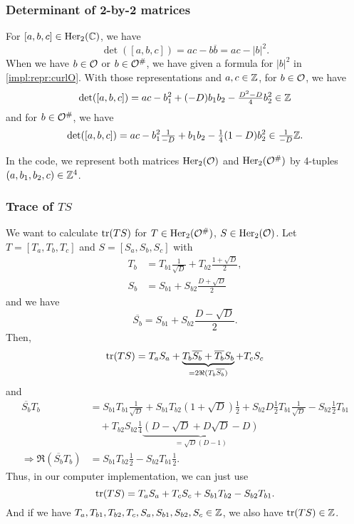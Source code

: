 \subsubsection{Determinant of 2-by-2 matrices}
\label{detCurlO}
For $[a,b,c] \in \operatorname{Her}_2(\mathbb{C})$, we have
\[ \det([a,b,c]) = ac - b \overline{b} = ac - |b|^2 . \]
%
When we have $b \in \mathcal{O}$ or $b \in \mathcal{O}^\#$, we have given a formula for $|b|^2$ in \cref{impl:repr:curlO}. With those representations and $a,c \in \mathbb{Z}$, for $b \in \mathcal{O}$, we have
\[ \det([a,b,c]) = a c -  b_1^2 + (-D) b_1 b_2 - \tfrac{D^2-D}{4} b_2^2 \in \mathbb{Z} \]
and for $b \in \mathcal{O}^\#$, we have
\[ \det([a,b,c]) = a c - b_1^2 \tfrac{1}{-D} + b_1 b_2 - \tfrac{1}{4} (1-D) b_2^2 \in \tfrac{1}{-D} \mathbb{Z} . \]

In the code, we represent both matrices $\operatorname{Her}_2(\mathcal{O})$ and $\operatorname{Her}_2(\mathcal{O}^\#)$ by 4-tuples $(a,b_1,b_2,c) \in \mathbb{Z}^4$.

\subsubsection{Trace of $TS$}
\label{traceST}
We want to calculate $\textup{\textrm{tr}}(TS)$ for $T \in \operatorname{Her}_2(\mathcal{O}^\#)$, $S \in \operatorname{Her}_2(\mathcal{O})$.
Let $T = [T_a, T_b, T_c]$ and $S = [S_a, S_b, S_c]$ with
\begin{align*}
T_b &= T_{b1} \frac{1}{\sqrt{D}} + T_{b2} \frac{1 + \sqrt{D}} {2} , \\
S_b &= S_{b1} + S_{b2} \frac{D + \sqrt{D}} {2}
\end{align*}
and we have
\[ \overline{S_b} = S_{b1} + S_{b2} \frac{D - \sqrt{D}} {2} . \]
Then,
\[
\textup{\textrm{tr}}(T S) = T_a S_a
+ \underbrace{T_b \overline{S_b} + \overline{T_b} S_b}_{= 2 \Re(T_b \overline{S_b})}
+ T_c S_c
\]
and
\begin{align*}
\overline{S_b} T_b &= S_{b1} T_{b1} \tfrac{1}{\sqrt{D}} + S_{b1} T_{b2} (1 + \sqrt{D}) \tfrac{1}{2}
+ S_{b2} D \tfrac{1}{2} T_{b1} \tfrac{1}{\sqrt{D}}
- S_{b2} \tfrac{1}{2} T_{b1} \\
&\quad + T_{b2} S_{b2} \tfrac{1}{4} \underbrace{(D - \sqrt{D} + D \sqrt{D} - D)}_{=\sqrt{D}(D-1)} \\
\Rightarrow \Re(\overline{S_b} T_b) &= S_{b1} T_{b2} \tfrac{1}{2} - S_{b2} T_{b1} \tfrac{1}{2} .
\end{align*}
Thus, in our computer implementation, we can just use
\[ \textup{\textrm{tr}}(T S) = T_a S_a + T_c S_c + S_{b1} T_{b2} - S_{b2} T_{b1} . \]
And if we have $T_a, T_{b1}, T_{b2}, T_{c}, S_a, S_{b1}, S_{b2}, S_c \in \mathbb{Z}$, we also have $\textup{\textrm{tr}}(TS) \in \mathbb{Z}$.


